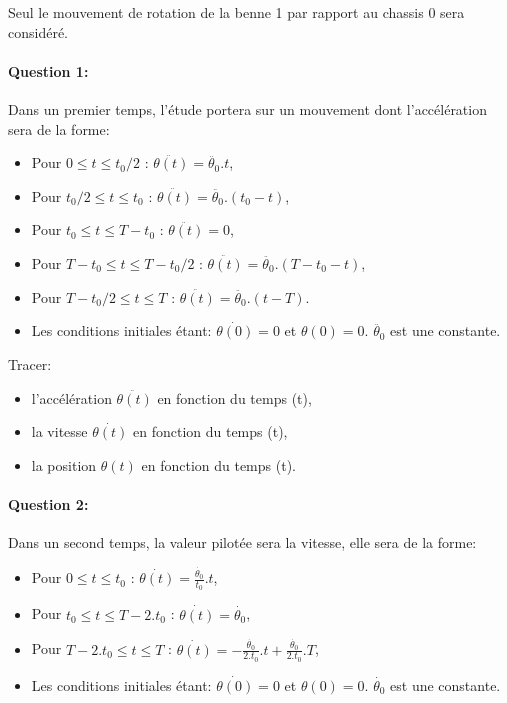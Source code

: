 Seul le mouvement de rotation de la benne 1 par rapport au chassis 0 sera considéré.

\paragraph{Question 1:} Dans un premier temps, l'étude portera sur un mouvement dont l'accélération sera de la forme:

\begin{itemize}
 \item Pour $0 \le t \le t_0/2$ : $\ddot{\theta(t)}=\ddot{\theta_0}.t$,
 \item Pour $t_0/2 \le t \le t_0$ : $\ddot{\theta(t)}=\ddot{\theta_0}.(t_0-t)$,
 \item Pour $t_0 \le t \le T-t_0$ : $\ddot{\theta(t)}=0$,
 \item Pour $T-t_0 \le t \le T-t_0/2$ : $\ddot{\theta(t)}=\ddot{\theta_0}.(T-t_0-t)$,
 \item Pour $T-t_0/2 \le t \le T$ : $\ddot{\theta(t)}=\ddot{\theta_0}.(t-T)$.
 \item Les conditions initiales étant: $\dot{\theta(0)}=0$ et $\theta(0)=0$. $\ddot{\theta_0}$ est une constante.
\end{itemize}

Tracer:
\begin{itemize}
 \item l'accélération $\ddot{\theta(t)}$ en fonction du temps (t),
 \item la vitesse $\dot{\theta(t)}$ en fonction du temps (t),
 \item la position $\theta(t)$ en fonction du temps (t).
\end{itemize}

\newpage

\paragraph{Question 2:} Dans un second temps, la valeur pilotée sera la vitesse, elle sera de la forme:

\begin{itemize}
 \item Pour $0 \le t \le t_0$ : $\dot{\theta(t)}=\frac{\dot{\theta_0}}{t_0}.t$,
 \item Pour $t_0 \le t \le T-2.t_0$ : $\dot{\theta(t)}=\dot{\theta_0}$,
 \item Pour $T-2.t_0 \le t \le T$ : $\dot{\theta(t)}=-\frac{\dot{\theta_0}}{2.t_0}.t+\frac{\dot{\theta_0}}{2.t_0}.T$,
 \item Les conditions initiales étant: $\dot{\theta(0)}=0$ et $\theta(0)=0$. $\dot{\theta_0}$ est une constante.
\end{itemize}

